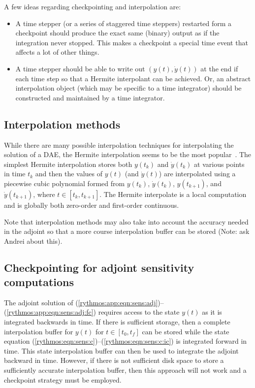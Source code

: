 \documentclass[pdf,ps2pdf,11pt]{SANDreport}
\begin{document}
A few ideas regarding checkpointing and interpolation are:
\begin{itemize}
%
{}\item A time stepper (or a series of staggered time steppers) restarted form
a checkpoint should produce the exact same (binary) output as if the
integration never stopped.  This makes a checkpoint a special time event that
affects a lot of other things.
%
{}\item A time stepper should be able to write out $(y(t),\dot{y}(t))$ at the
end if each time step so that a Hermite interpolant can be achieved.  Or, an
abstract interpolation object (which may be specific to a time integrator)
should be constructed and maintained by a time integrator.
%
\end{itemize}

\subsection{Interpolation methods}

While there are many possible interpolation techniques for interpolating the
solution of a DAE, the Hermite interpolation seems to be the most
popular~\cite{sundials}.  The simplest Hermite interpolation stores both
$y(t_k)$ and $\dot{y}(t_k)$ at various points in time $t_k$ and then the
values of $y(t)$ (and $\dot{y}(t)$) are interpolated using a piecewise cubic
polynomial formed from $y(t_k)$, $\dot{y}(t_k)$, $y(t_{k+1})$, and
$\dot{y}(t_{k+1})$, where $t\in[t_k,t_{k+1}]$.  The Hermite interpolate is a
local computation and is globally both zero-order and first-order continuous.

Note that interpolation methods may also take into account the accuracy needed
in the adjoint so that a more course interpolation buffer can be stored (Note:
ask Andrei about this).

\subsection{Checkpointing for adjoint sensitivity computations}

The adjoint solution of
(\ref{rythmos:app:eqn:sens:adj})--(\ref{rythmos:app:eqn:sens:adj:fc}) requires
access to the state $y(t)$ as it is integrated backwards in time.  If there is
sufficient storage, then a complete interpolation buffer for $y(t)$ for
$t\in[t_0,t_f]$ can be stored while the state equation
(\ref{rythmos:eqn:sens:c})--(\ref{rythmos:eqn:sens:c:ic}) is integrated
forward in time.  This state interpolation buffer can then be used to
integrate the adjoint backward in time.  However, if there is not sufficient
disk space to store a sufficiently accurate interpolation buffer, then this
approach will not work and a checkpoint strategy must be employed.
\end{document}
